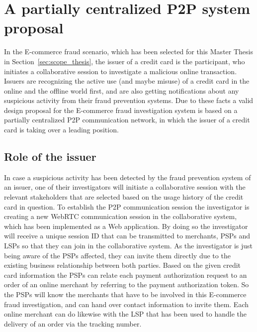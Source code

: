 
\section{A partially centralized \gls{P2P} system proposal}
\label{sec:p2p_partially_centralized_system}

In the \gls{E-commerce} fraud scenario, which has been selected for this Master Thesis in Section~\ref{sec:scope_thesis}, the issuer of a credit card is the participant, who initiates a collaborative session to investigate a malicious online transaction. Issuers are recognizing the active use (and maybe misuse) of a credit card in the online and the offline world first, and are also getting notifications about any suspicious activity from their fraud prevention systems. Due to these facts a valid design proposal for the \gls{E-commerce} fraud investigation system is based on a partially centralized \gls{P2P} communication network, in which the issuer of a credit card is taking over a leading position.

\subsection{Role of the issuer}
\label{subsec:p2p_partially_issuer_collecting}

In case a suspicious activity has been detected by the fraud prevention system of an issuer, one of their investigators will initiate a collaborative session with the relevant stakeholders that are selected based on the usage history of the credit card in question. To establish the \gls{P2P} communication session the investigator is creating a new \gls{WebRTC} communication session in the collaborative system, which has been implemented as a Web application. By doing so the investigator will receive a unique session ID that can be transmitted to merchants, \gls{PSP}s and \gls{LSP}s so that they can join in the collaborative system. As the investigator is just being aware of the \gls{PSP}s affected, they can invite them directly due to the existing business relationship between both parties. Based on the given credit card information the \gls{PSP}s can relate each payment authorization request to an order of an online merchant by referring to the payment authorization token. So the \gls{PSP}s will know the merchants that have to be involved in this \gls{E-commerce} fraud investigation, and can hand over contact information to invite them. Each online merchant can do likewise with the \gls{LSP} that has been used to handle the delivery of an order via the tracking number. \\

